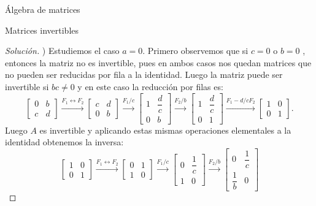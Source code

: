 \begin{chapter}{\'Algebra de matrices}
\begin{section}{Matrices invertibles}
\begin{proof}[Solución]
                ) Estudiemos el caso $a=0$. Primero observemos que si $c=0$ o $b=0$ , entonces la matriz no es invertible, pues en ambos casos nos quedan matrices que no pueden ser reducidas por fila a la identidad. Luego la matriz puede ser invertible si $bc\not=0$ y en este caso la reducción por filas es:
                \begin{equation*}
                \begin{bmatrix}0&b\\c&d\end{bmatrix} \stackrel{F_1\leftrightarrow F_2}{\longrightarrow}
                \begin{bmatrix}c&d\\0&b\end{bmatrix} \stackrel{F_1/c}{\longrightarrow}
                \begin{bmatrix}1&\dfrac{d}{c}\\[6pt]0&b\end{bmatrix} \stackrel{F_2/b}{\longrightarrow}
                \begin{bmatrix}1&\dfrac{d}{c}\\[6pt]0&1\end{bmatrix}
                \stackrel{F_1 - d/c F_2}{\longrightarrow}
                \begin{bmatrix}1&0\\0&1\end{bmatrix}.
                \end{equation*}   
                Luego $A$  es invertible y aplicando estas mismas operaciones elementales a la identidad  obtenemos la inversa:
                \begin{equation*}
                \begin{bmatrix}1&0\\0&1\end{bmatrix} \stackrel{F_1\leftrightarrow F_2}{\longrightarrow}
                \begin{bmatrix}0&1\\1&0\end{bmatrix} \stackrel{F_1/c}{\longrightarrow}
                \begin{bmatrix}0&\dfrac{1}{c}\\[6pt]1&0\end{bmatrix} \stackrel{F_2/b}{\longrightarrow}
                \begin{bmatrix}0&\dfrac{1}{c}\\[6pt]\dfrac{1}{b}&0\end{bmatrix}

\end{equation*}
\end{proof}
\end{section}
\end{chapter}
